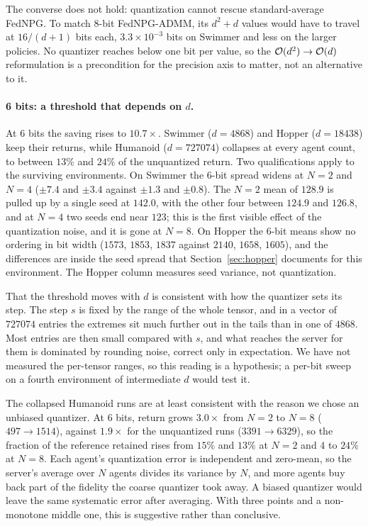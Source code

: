 The converse does not hold: quantization cannot rescue standard-average
FedNPG. To match 8-bit FedNPG-ADMM, its $d^2 + d$ values would have to travel
at $16/(d+1)$ bits each, $3.3 \times 10^{-3}$ bits on Swimmer and less on the
larger policies. No quantizer reaches below one bit per value, so the
$\mathcal{O}(d^2) \to \mathcal{O}(d)$ reformulation is a precondition for the precision axis
to matter, not an alternative to it.

\paragraph{6 bits: a threshold that depends on $d$.} At 6 bits the saving
rises to $10.7\times$. Swimmer ($d = \num{4868}$) and Hopper
($d = \num{18438}$) keep their returns, while Humanoid ($d = \num{727074}$)
collapses at every agent count, to between $13\%$ and $24\%$ of the
unquantized return. Two qualifications apply to the surviving environments. On
Swimmer the 6-bit spread widens at $N = 2$ and $N = 4$ ($\pm 7.4$ and $\pm 3.4$
against $\pm 1.3$ and $\pm 0.8$). The $N=2$ mean of $128.9$ is pulled up by a
single seed at $142.0$, with the other four between $124.9$ and $126.8$, and at
$N=4$ two seeds end near $123$; this is the first visible effect of the
quantization noise, and it is gone at $N = 8$. On Hopper the 6-bit means show no
ordering in bit width ($1573$, $1853$, $1837$ against $2140$, $1658$, $1605$),
and the differences are inside the seed spread that Section~\ref{sec:hopper}
documents for this environment. The Hopper column measures seed variance, not
quantization.

That the threshold moves with $d$ is consistent with how the quantizer sets
its step. The step $s$ is fixed by the range of the whole tensor, and in a
vector of $\num{727074}$ entries the extremes sit much further out in the
tails than in one of $\num{4868}$. Most entries are then small compared with
$s$, and what reaches the server for them is dominated by rounding noise,
correct only in expectation. We have not measured the per-tensor ranges, so this reading is a
hypothesis; a per-bit sweep on a fourth environment of intermediate $d$ would
test it.

The collapsed Humanoid runs are at least consistent with the reason we
chose an unbiased quantizer. At 6 bits, return grows $3.0\times$ from $N=2$ to
$N=8$ ($497 \to 1514$), against $1.9\times$ for the unquantized runs
($3391 \to 6329$), so the fraction of the reference retained rises from
$15\%$ and $13\%$ at $N = 2$ and $4$ to $24\%$ at $N=8$. Each agent's
quantization error is independent and zero-mean, so the server's average over
$N$ agents divides its variance by $N$, and more agents buy back part of the
fidelity the coarse quantizer took away. A biased quantizer would leave the
same systematic error after averaging. With three points and a non-monotone
middle one, this is suggestive rather than conclusive.

